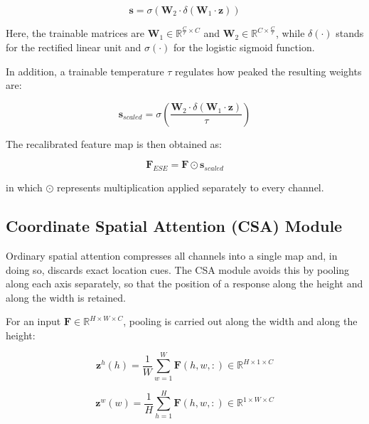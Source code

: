 \documentclass[default, iicol]{sn-jnl}
\theoremstyle{thmstyleone}%
\theoremstyle{thmstyletwo}%
\theoremstyle{thmstylethree}%
\begin{document}
\begin{equation}
\mathbf{s} = \sigma\left(\mathbf{W}_2 \cdot \delta\left(\mathbf{W}_1 \cdot \mathbf{z}\right)\right)
\label{eq:se_weights}
\end{equation}

Here, the trainable matrices are $\mathbf{W}_1 \in \mathbb{R}^{\frac{C}{r} \times C}$ and $\mathbf{W}_2 \in \mathbb{R}^{C \times \frac{C}{r}}$, while $\delta(\cdot)$ stands for the rectified linear unit and $\sigma(\cdot)$ for the logistic sigmoid function.

In addition, a trainable temperature $\tau$ regulates how peaked the resulting weights are:

\begin{equation}
\mathbf{s}_{scaled} = \sigma\left(\frac{\mathbf{W}_2 \cdot \delta\left(\mathbf{W}_1 \cdot \mathbf{z}\right)}{\tau}\right)
\label{eq:temp_scaling}
\end{equation}

The recalibrated feature map is then obtained as:

\begin{equation}
\mathbf{F}_{ESE} = \mathbf{F} \odot \mathbf{s}_{scaled}
\label{eq:ese_output}
\end{equation}

in which $\odot$ represents multiplication applied separately to every channel.

\subsection{Coordinate Spatial Attention (CSA) Module}

Ordinary spatial attention compresses all channels into a single map and, in doing so, discards exact location cues. The CSA module avoids this by pooling along each axis separately, so that the position of a response along the height and along the width is retained.

For an input $\mathbf{F} \in \mathbb{R}^{H \times W \times C}$, pooling is carried out along the width and along the height:

\begin{equation}
\mathbf{z}^h(h) = \frac{1}{W} \sum_{w=1}^{W} \mathbf{F}(h,w,:) \in \mathbb{R}^{H \times 1 \times C}
\label{eq:h_pool}
\end{equation}

\begin{equation}
\mathbf{z}^w(w) = \frac{1}{H} \sum_{h=1}^{H} \mathbf{F}(h,w,:) \in \mathbb{R}^{1 \times W \times C}
\label{eq:w_pool}
\end{equation}
\end{document}
